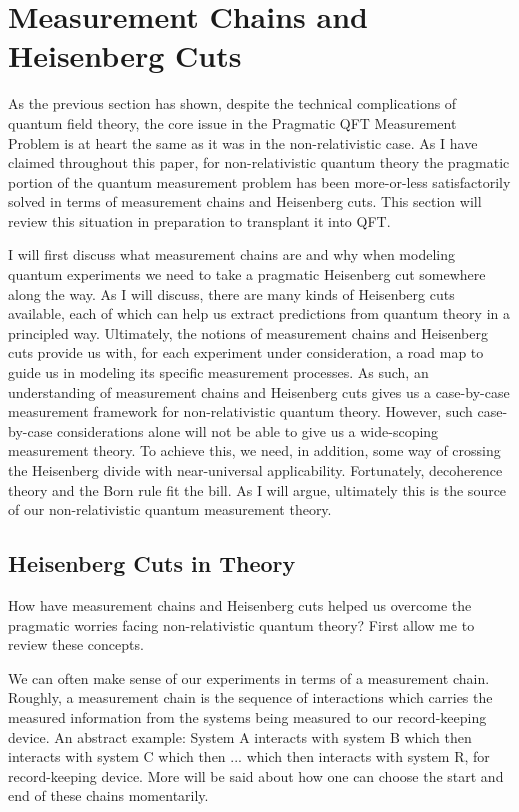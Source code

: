 \documentclass[prd,twocolumn,superscriptaddress,floatfix,amsmath,amssymb,amsfonts,nofootinbib]{revtex4-2}
\begin{document}
\section{Measurement Chains and Heisenberg Cuts}\label{ChainsAndCuts}
As the previous section has shown, despite the technical complications of quantum field theory, the core issue in the Pragmatic QFT Measurement Problem is at heart the same as it was in the non-relativistic case. As I have claimed throughout this paper, for non-relativistic quantum theory the pragmatic portion of the quantum measurement problem has been more-or-less satisfactorily solved in terms of measurement chains and Heisenberg cuts. This section will review this situation in preparation to transplant it into QFT.

I will first discuss what measurement chains are and why when modeling quantum experiments we need to take a pragmatic Heisenberg cut somewhere along the way. As I will discuss, there are many kinds of Heisenberg cuts available, each of which can help us extract predictions from quantum theory in a principled way. Ultimately, the notions of measurement chains and Heisenberg cuts provide us with, for each experiment under consideration, a road map to guide us in modeling its specific measurement processes. As such, an understanding of measurement chains and Heisenberg cuts gives us a case-by-case measurement framework for non-relativistic quantum theory. However, such case-by-case considerations alone will not be able to give us a wide-scoping measurement theory. To achieve this, we need, in addition, some way of crossing the Heisenberg divide with near-universal applicability. Fortunately, decoherence theory and the Born rule fit the bill. As I will argue, ultimately this is the source of our non-relativistic quantum measurement theory.

\subsection{Heisenberg Cuts in Theory}
How have measurement chains and Heisenberg cuts helped us overcome the pragmatic worries facing non-relativistic quantum theory? First allow me to review these concepts.

We can often make sense of our experiments in terms of a measurement chain. Roughly, a measurement chain is the sequence of interactions which carries the measured information from the systems being measured to our record-keeping device. An abstract example: System A interacts with system B which then interacts with system C which then ... which then interacts with system R, for record-keeping device. More will be said about how one can choose the start and end of these chains momentarily.
\end{document}

